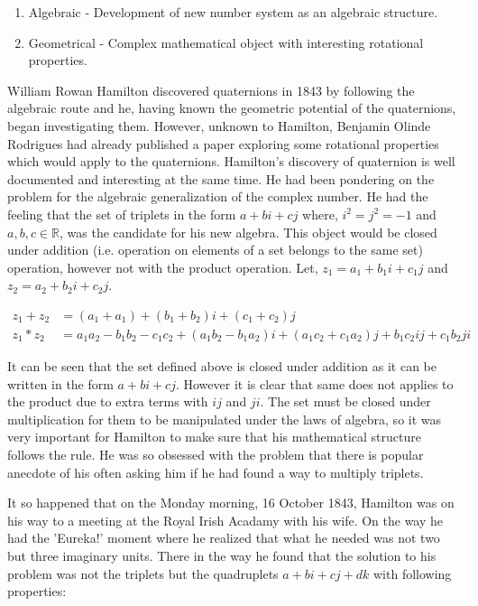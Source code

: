 \documentclass[12pt]{article}
\begin{document}
\begin{enumerate} \itemsep0em
    \item Algebraic - Development of new number system as an algebraic structure.
    \item Geometrical - Complex mathematical object with interesting rotational properties.
\end{enumerate}

William Rowan Hamilton discovered quaternions in 1843 by following the algebraic route and he, having known the geometric potential of the quaternions, began investigating them.
However, unknown to Hamilton, Benjamin Olinde Rodrigues had already published a paper exploring some rotational properties which would apply to the quaternions. Hamilton's discovery of quaternion is well documented and interesting at the same time. He had been pondering on the problem for the algebraic generalization of the complex number. He had the feeling that the set of triplets in the form $a + bi + cj$ where, $i^{2} = j^{2} = -1$ and $a, b, c \in \mathbb{R}$, was the candidate for his new algebra. This object would be closed under addition (i.e. operation on elements of a set belongs to the same set) operation, however not with the product operation. Let, $z_{1} = a_{1} + b_{1}i + c_{1}j$ and $z_{2} = a_{2} + b_{2}i + c_{2}j$.

\begin{equation}
    \begin{split}
        z_{1} + z_{2} &= (a_{1}+a_{1}) + (b_{1} + b_{2})i + (c_{1} + c_{2})j \\
        z_{1} * z_{2} &= a_1a_2-b_1b_2-c_1c_2 + (a_1b_2 - b_1a_2)i + (a_1c_2 + 
        c_1a_2)j + b_1c_2ij + c_1b_2ji
    \end{split}
\end{equation}

It can be seen that the set defined above is closed under addition as it can be written in the form $a + bi + cj$. However it is clear that same does not applies to the product due to extra terms with $ij$ and $ji$. The set must be closed under multiplication for them to be manipulated under the laws of algebra, so it was very important for Hamilton to make sure that his mathematical structure follows the rule. He was so obsessed with the problem that there is popular anecdote of his often asking him if he had found a way to multiply triplets. 

It so happened that on the Monday morning, 16 October 1843, Hamilton was on his way to a meeting at the Royal Irish Acadamy with his wife. On the way he had the 'Eureka!' moment where he realized that what he needed was not two but three imaginary units. There in the way he found that the solution to his problem was not the triplets but the quadruplets $a + bi + cj + dk$ with following properties:
\end{document}
